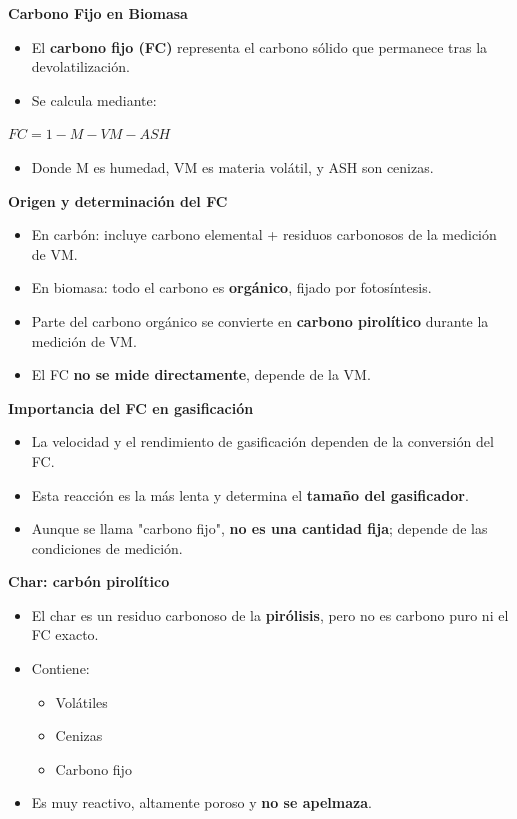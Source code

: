 \documentclass[../../main.tex]{subfiles}
\begin{document}
\begin{frame}{\textbf{Carbono Fijo en Biomasa}}
\small
\begin{itemize}
    \item El \textbf{carbono fijo (FC)} representa el carbono s\'olido que permanece tras la devolatilizaci\'on.
    \item Se calcula mediante:
\end{itemize}
\(
FC = 1 - M - VM - ASH 
\)
\begin{itemize}
    \item Donde M es humedad, VM es materia vol\'atil, y ASH son cenizas.
\end{itemize}
\textbf{Origen y determinaci\'on del FC}
\begin{itemize}
    \item En carb\'on: incluye carbono elemental + residuos carbonosos de la medici\'on de VM.
    \item En biomasa: todo el carbono es \textbf{org\'anico}, fijado por fotos\'intesis.
    \item Parte del carbono org\'anico se convierte en \textbf{carbono pirol\'itico} durante la medici\'on de VM.
    \item El FC \textbf{no se mide directamente}, depende de la VM.
\end{itemize}
\end{frame}

\begin{frame}{\textbf{Importancia del FC en gasificaci\'on}}
\begin{itemize}
    \item La velocidad y el rendimiento de gasificaci\'on dependen de la conversi\'on del FC.
    \item Esta reacci\'on es la m\'as lenta y determina el \textbf{tama\~no del gasificador}.
    \item Aunque se llama "carbono fijo", \textbf{no es una cantidad fija}; depende de las condiciones de medici\'on.
\end{itemize}
\textbf{Char: carb\'on pirol\'itico}
\begin{itemize}
    \item El char es un residuo carbonoso de la \textbf{pir\'olisis}, pero no es carbono puro ni el FC exacto.
    \item Contiene:
    \begin{itemize}
        \item Vol\'atiles
        \item Cenizas
        \item Carbono fijo
    \end{itemize}
    \item Es muy reactivo, altamente poroso y \textbf{no se apelmaza}.
\end{itemize}
\end{frame}
\end{document}
